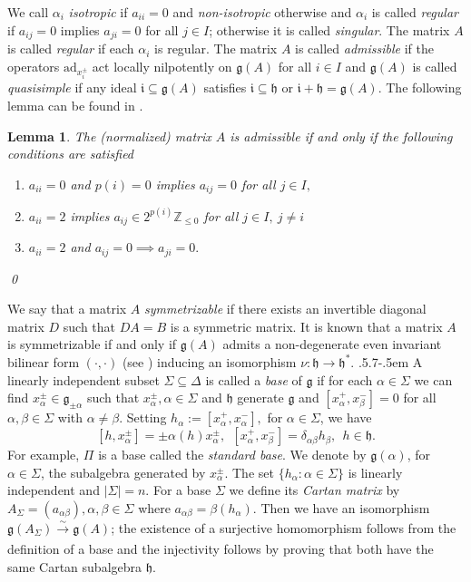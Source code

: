 \documentclass[11pt,reqno]{amsart}
\makeatletter
\theoremstyle{plain}
\newtheorem*{lemma}{Lemma}
\theoremstyle{definition}
\theoremstyle{remark}
\newcommand{\lie}[1]{\mathfrak{#1}}
\newcommand\bz{\mathbb Z}
\numberwithin{equation}{section}
\def\subsection{\def\@secnumfont{\bfseries}\@startsection{subsection}{2}%
  {\parindent}{.5\linespacing\@plus.7\linespacing}{-.5em}%
  {\normalfont\bfseries}}
\makeatother
\begin{document}
We call $\alpha_i$ \textit{isotropic} if $a_{ii}=0$ and \textit{non-isotropic} otherwise and $\alpha_i$ is called \textit{regular} if $a_{ij}=0$ implies $a_{ji}=0$ for all $j\in I$; otherwise it is called \textit{singular}. The matrix $A$ is called \textit{regular} if each $\alpha_i$ is regular. The matrix $A$ is called \textit{admissible} if the operators $\mathrm{ad}_{x_i^{\pm}}$ act locally nilpotently on $\lie{g}(A)$ for all $i\in I$ and $\lie g(A)$ is called \textit{quasisimple} if any ideal $\lie{i}\subseteq \lie{g}(A)$ satisfies $\lie{i}\subseteq \lie{h}$ or $\lie{i}+\lie{h}=\lie g(A).$
The following lemma can be found in \cite[Section 2]{Serganova11KacMoody}.
\begin{lemma}\label{admatrix}
  The (normalized) matrix $A$ is admissible if and only if the following conditions are satisfied
    \begin{enumerate}
    \item $a_{ii}=0$ and $p(i)=0$ implies $a_{ij}=0$ for all $j\in I,$
    \item $a_{ii}=2$ implies $a_{ij}\in 2^{p(i)}\bz_{\le 0}$ for all $j\in I, \ j\neq i$  
    \item $a_{ii}=2$ and $a_{ij}=0\implies a_{ji}=0.$
    \end{enumerate}
    \qed
\end{lemma}
We say that a matrix $A$ \textit{symmetrizable} if there exists an invertible diagonal matrix $D$ such that $DA=B$ is a symmetric matrix. It is known that a matrix $A$ is symmetrizable if and only if $\lie g(A)$ admits a non-degenerate even invariant bilinear form $(\cdot,\cdot)$ (see \cite[Proposition 4.2]{vander89Classification}) inducing an isomorphism $\nu: \lie h\rightarrow \lie h^{*}$. 
\subsection{} A linearly independent subset $\Sigma\subseteq \Delta$ is called a \textit{base} of $\lie g$ if for each $\alpha\in\Sigma$ we can find $x_\alpha^{\pm}\in \lie g_{\pm \alpha}$ such that $x_{\alpha}^\pm,\alpha\in\Sigma$ and $\lie h$ generate $\lie g$ and $[x_\alpha^+,x_\beta^-]=0$ for all $\alpha,\beta\in \Sigma$ with $\alpha\neq \beta$.
Setting $h_{\alpha}:=[x_{\alpha}^+,x_{\alpha}^-],$ for $\alpha\in \Sigma$, we have 
$$[h,x_{\alpha}^\pm]=\pm \alpha(h)x_\alpha^\pm,\ \ [x_\alpha^+,x_\beta^-]=\delta_{\alpha \beta} h_\beta,\ \ h\in\lie{h}.$$
For example, $\Pi$ is a base called the \textit{standard base}.  We denote by $\lie g(\alpha)$, for $\alpha\in \Sigma$, the subalgebra generated by $x_{\alpha}^{\pm}$. The set $\{h_\alpha:\alpha\in \Sigma\}$ is linearly independent and $|\Sigma|=n$. 
For a base $\Sigma$ we define its \textit{Cartan matrix} by $A_\Sigma=(a_{\alpha\beta}), \alpha,\beta\in\Sigma$ where $a_{\alpha\beta}=\beta(h_\alpha)$. Then we have an isomorphism $\lie g(A_{\Sigma})\xrightarrow[]{\sim} \lie g(A)$; the existence of a surjective homomorphism follows from the definition of a base and the injectivity follows by proving that both have the same Cartan subalgebra $\lie h$.
\end{document}
